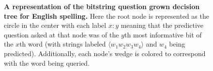 \documentclass[12pt]{article}
\begin{document}
\begin{figure}
  \centering
  \vspace{-1in}
  \caption{\textbf{A representation of the bitstring question grown
      decision tree for English spelling.} Here the root node is
    represented as the circle in the center with each label $x:y$
    meaning that the predictive question asked at that node was of the
    $y$th most informative bit of the $x$th word (with strings labeled
    $\langle w_1 w_2 w_3 w_4 \rangle$ and $w_4$ being
    predicted). Additionally, each node's wedge is colored to
    correspond with the word being queried.}
  \label{fig:bs_wedges}
\end{figure}
\end{document}
